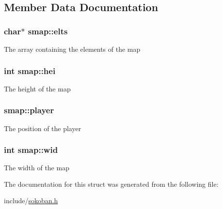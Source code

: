 \subsection{Member Data Documentation}
\hypertarget{structsmap_af33eeab2c54ceb47a2998c0257e4b476}{
\subsubsection[{elts}]{\setlength{\rightskip}{0pt plus 5cm}char$\ast$ smap\-::elts}}\label{structsmap_af33eeab2c54ceb47a2998c0257e4b476}
The array containing the elements of the map \hypertarget{structsmap_aff5560dc909084c06a274c6dd717f475}{
\subsubsection[{hei}]{\setlength{\rightskip}{0pt plus 5cm}int smap\-::hei}}\label{structsmap_aff5560dc909084c06a274c6dd717f475}
The height of the map \hypertarget{structsmap_a854fbb51a1e657cd9500b3cc81d3607c}{
\subsubsection[{player}]{ smap\-::player}}\label{structsmap_a854fbb51a1e657cd9500b3cc81d3607c}
The position of the player \hypertarget{structsmap_aec8bed128626d11883c7661b6acc2af1}{
\subsubsection[{wid}]{\setlength{\rightskip}{0pt plus 5cm}int smap\-::wid}}\label{structsmap_aec8bed128626d11883c7661b6acc2af1}
The width of the map 

The documentation for this struct was generated from the following file\-:\begin{DoxyCompactItemize}
\item 
include/\hyperlink{sokoban_8h}{sokoban.\-h}\end{DoxyCompactItemize}
